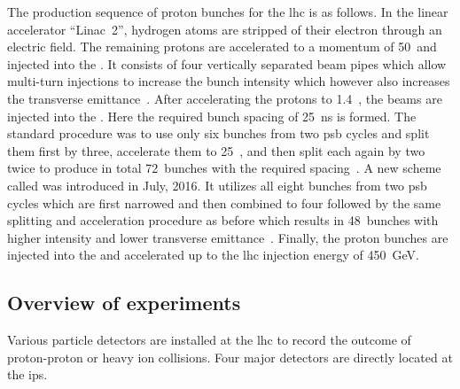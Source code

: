 The production sequence of proton bunches for the \gls{lhc} is as follows. In the linear accelerator ``Linac~2'', hydrogen atoms are stripped of their electron through an electric field. The remaining protons are accelerated to a momentum of 50~\MeV and injected into the . It consists of four vertically separated beam pipes which allow multi-turn injections to increase the bunch intensity which however also increases the transverse emittance~\cite{doi:10.1142/S0217751X13300196}. After accelerating the protons to 1.4~\GeV, the beams are injected into the . Here the required bunch spacing of 25~ns is formed. The standard procedure was to use only six bunches from two \gls{psb} cycles and split them first by three, accelerate them to 25~\GeV, and then split each again by two twice to produce in total 72~bunches with the required spacing~\cite{Benedikt:2001ar}. A new scheme called  was introduced in July, 2016. It utilizes all eight bunches from two \gls{psb} cycles which are first narrowed and then combined to four followed by the same splitting and acceleration procedure as before which results in 48~bunches with higher intensity and lower transverse emittance~\cite{bcms}. Finally, the proton bunches are injected into the  and accelerated up to the \gls{lhc} injection energy of 450~GeV.


\subsection{Overview of experiments}

Various particle detectors are installed at the \gls{lhc} to record the outcome of proton-proton or heavy ion collisions. Four major detectors are directly located at the \glspl{ip}. 

